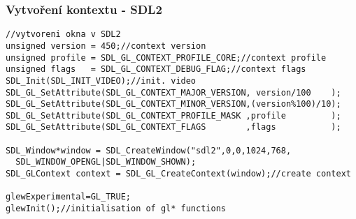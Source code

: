 \begin{frame}[fragile]
\frametitle{Vytvoření kontextu - SDL2}
	{\scriptsize
	\begin{verbatim}
//vytvoreni okna v SDL2
unsigned version = 450;//context version
unsigned profile = SDL_GL_CONTEXT_PROFILE_CORE;//context profile
unsigned flags   = SDL_GL_CONTEXT_DEBUG_FLAG;//context flags
SDL_Init(SDL_INIT_VIDEO);//init. video
SDL_GL_SetAttribute(SDL_GL_CONTEXT_MAJOR_VERSION, version/100    );
SDL_GL_SetAttribute(SDL_GL_CONTEXT_MINOR_VERSION,(version%100)/10);
SDL_GL_SetAttribute(SDL_GL_CONTEXT_PROFILE_MASK ,profile         );
SDL_GL_SetAttribute(SDL_GL_CONTEXT_FLAGS        ,flags           );

SDL_Window*window = SDL_CreateWindow("sdl2",0,0,1024,768,
  SDL_WINDOW_OPENGL|SDL_WINDOW_SHOWN);
SDL_GLContext context = SDL_GL_CreateContext(window);//create context

glewExperimental=GL_TRUE;
glewInit();//initialisation of gl* functions
	\end{verbatim}
	}
\end{frame}


